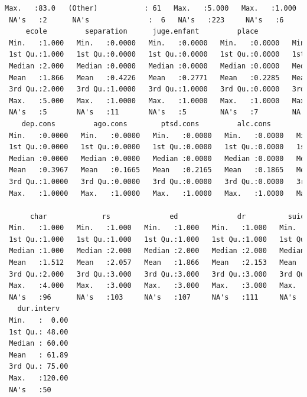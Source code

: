 \begin{lstlisting}[language=html]
 Max.   :83.0   (Other)           : 61   Max.   :5.000   Max.   :1.000   Max.   :13.000   Max.   :21.000  
 NA's   :2      NA's              :  6   NA's   :223     NA's   :6       NA's   :26                       
     ecole         separation      juge.enfant         place             abus          grav.cons    
 Min.   :1.000   Min.   :0.0000   Min.   :0.0000   Min.   :0.0000   Min.   :0.0000   Min.   :1.000  
 1st Qu.:1.000   1st Qu.:0.0000   1st Qu.:0.0000   1st Qu.:0.0000   1st Qu.:0.0000   1st Qu.:2.000  
 Median :2.000   Median :0.0000   Median :0.0000   Median :0.0000   Median :0.0000   Median :4.000  
 Mean   :1.866   Mean   :0.4226   Mean   :0.2771   Mean   :0.2285   Mean   :0.2778   Mean   :3.643  
 3rd Qu.:2.000   3rd Qu.:1.0000   3rd Qu.:1.0000   3rd Qu.:0.0000   3rd Qu.:1.0000   3rd Qu.:5.000  
 Max.   :5.000   Max.   :1.0000   Max.   :1.0000   Max.   :1.0000   Max.   :1.0000   Max.   :7.000  
 NA's   :5       NA's   :11       NA's   :5        NA's   :7        NA's   :7        NA's   :4      
    dep.cons         ago.cons        ptsd.cons         alc.cons        subst.cons        scz.cons     
 Min.   :0.0000   Min.   :0.0000   Min.   :0.0000   Min.   :0.0000   Min.   :0.0000   Min.   :0.0000  
 1st Qu.:0.0000   1st Qu.:0.0000   1st Qu.:0.0000   1st Qu.:0.0000   1st Qu.:0.0000   1st Qu.:0.0000  
 Median :0.0000   Median :0.0000   Median :0.0000   Median :0.0000   Median :0.0000   Median :0.0000  
 Mean   :0.3967   Mean   :0.1665   Mean   :0.2165   Mean   :0.1865   Mean   :0.2653   Mean   :0.0826  
 3rd Qu.:1.0000   3rd Qu.:0.0000   3rd Qu.:0.0000   3rd Qu.:0.0000   3rd Qu.:1.0000   3rd Qu.:0.0000  
 Max.   :1.0000   Max.   :1.0000   Max.   :1.0000   Max.   :1.0000   Max.   :1.0000   Max.   :1.0000  
                                                                                                      
      char             rs              ed              dr          suicide.s        suicide.hr      suicide.past   
 Min.   :1.000   Min.   :1.000   Min.   :1.000   Min.   :1.000   Min.   :0.0000   Min.   :0.0000   Min.   :0.0000  
 1st Qu.:1.000   1st Qu.:1.000   1st Qu.:1.000   1st Qu.:1.000   1st Qu.:0.0000   1st Qu.:0.0000   1st Qu.:0.0000  
 Median :1.000   Median :2.000   Median :2.000   Median :2.000   Median :0.0000   Median :0.0000   Median :0.0000  
 Mean   :1.512   Mean   :2.057   Mean   :1.866   Mean   :2.153   Mean   :0.7942   Mean   :0.2013   Mean   :0.2841  
 3rd Qu.:2.000   3rd Qu.:3.000   3rd Qu.:3.000   3rd Qu.:3.000   3rd Qu.:1.0000   3rd Qu.:0.0000   3rd Qu.:1.0000  
 Max.   :4.000   Max.   :3.000   Max.   :3.000   Max.   :3.000   Max.   :5.0000   Max.   :1.0000   Max.   :1.0000  
 NA's   :96      NA's   :103     NA's   :107     NA's   :111     NA's   :41       NA's   :39       NA's   :14      
   dur.interv    
 Min.   :  0.00  
 1st Qu.: 48.00  
 Median : 60.00  
 Mean   : 61.89  
 3rd Qu.: 75.00  
 Max.   :120.00  
 NA's   :50     


\end{lstlisting}
